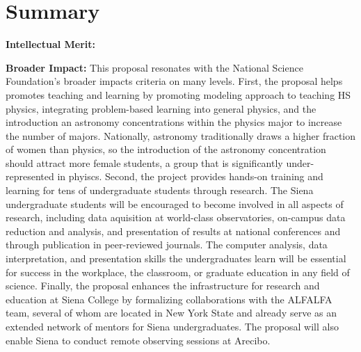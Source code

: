 \documentclass[11pt, preprint]{aastex}
\begin{document}
{


\vspace*{-.7cm}
\section{Summary}
\vspace*{-.25cm}

{\bf Intellectual Merit:} 


{\bf Broader Impact:} This proposal resonates with the National Science Foundation's {broader impacts}
criteria on many levels.  
First, the proposal helps promotes teaching and learning by
promoting
modeling approach to teaching HS physics, integrating problem-based learning into general physics,
and the introduction an astronomy 
concentrations within the physics major to increase the number of majors.
Nationally, astronomy traditionally draws a higher fraction of women than physics, so 
the introduction of the astronomy concentration should attract more female students, 
a group that is significantly under-represented in phyiscs.
Second, the project provides hands-on training and learning for tens of 
undergraduate students through research.  
The Siena undergraduate students will be 
encouraged to become involved in all aspects
of research, including data aquisition at world-class observatories, on-campus 
data reduction and analysis, and presentation of results at national
conferences and through publication in peer-reviewed journals.
The computer analysis, data interpretation, and presentation skills the
undergraduates learn 
will be essential for success in
the workplace, the classroom, or graduate education in any field of science. 
Finally,
the proposal enhances the infrastructure for research and education at Siena College 
by formalizing collaborations
with the ALFALFA team, several of whom are located in New York State and already serve as an
extended network of mentors for Siena undergraduates.
The proposal will also enable Siena to conduct remote observing sessions at Arecibo.

}
\end{document}
